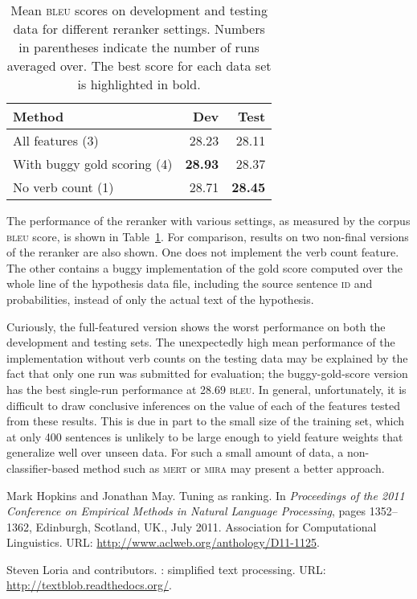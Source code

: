 \documentclass[11pt,twocolumn]{article}
\begin{document}
\begin{table}
\center
\begin{tabular}{lrr}\\
\textbf{Method} &
\textbf{Dev} &
\textbf{Test} \\
\hline
All features (3)            & 28.23 & 28.11 \\
With buggy gold scoring (4) & \textbf{28.93} & 28.37 \\
No verb count (1)           & 28.71 & \textbf{28.45}
\end{tabular}
\caption{\label{tab:bleu}
Mean \textsc{bleu} scores on development and testing data for
different reranker settings.
Numbers in parentheses indicate the number of runs averaged over.
The best score for each data set is highlighted in bold.}
\end{table}

The performance of the reranker with various settings, as measured by
the corpus \textsc{bleu} score, is shown in Table~\ref{tab:bleu}.
For comparison, results on two non-final versions of the reranker are
also shown.
One does not implement the verb count feature.
The other contains a buggy implementation of the gold score computed
over the whole line of the hypothesis data file, including the source
sentence \textsc{id} and probabilities, instead of only the actual text
of the hypothesis.

Curiously, the full-featured version shows the worst performance on both
the development and testing sets.
The unexpectedly high mean performance of the implementation without
verb counts on the testing data may be explained by the fact that only
one run was submitted for evaluation; the buggy-gold-score version has
the best single-run performance at 28.69 \textsc{bleu}.
In general, unfortunately, it is difficult to draw conclusive inferences
on the value of each of the features tested from these results.
This is due in part to the small size of the training set, which at
only 400 sentences is unlikely to be large enough to yield feature
weights that generalize well over unseen data.
For such a small amount of data, a non-classifier-based method such as
\textsc{mert} or \textsc{mira} may present a better approach.

\begin{thebibliography}{1}

Mark Hopkins and Jonathan May.
\newblock Tuning as ranking.
\newblock In {\em Proceedings of the 2011 Conference on Empirical Methods in
  Natural Language Processing}, pages 1352--1362, Edinburgh, Scotland, UK.,
  July 2011. Association for Computational Linguistics.
\newblock URL: \url{http://www.aclweb.org/anthology/D11-1125}.

Steven Loria and contributors.
: simplified text processing.
\newblock URL: \url{http://textblob.readthedocs.org/}.

\end{thebibliography}
\end{document}
